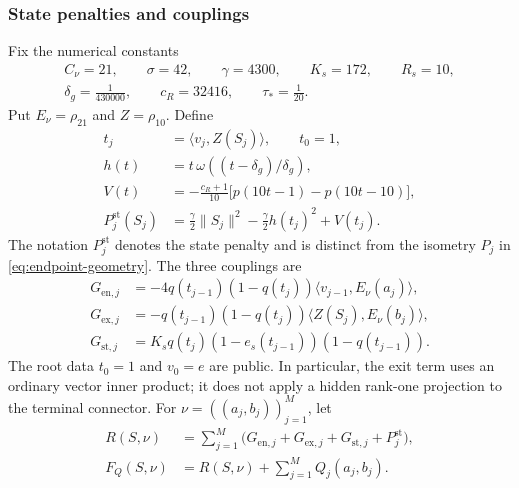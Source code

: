 \documentclass[11pt,letterpaper]{article}
\theoremstyle{definition}
\theoremstyle{remark}
\begin{document}
\subsubsection{State penalties and couplings}

Fix the numerical constants
\begin{equation}
\begin{gathered}
 C_\nu=21,\qquad \sigma=42,\qquad \gamma=4300,
 \qquad K_s=172,\qquad R_s=10,\\
 \delta_g=\frac1{430000},\qquad c_R=32416,
 \qquad \tau_* =\frac1{20}.
\end{gathered}
\label{eq:outer-constants}
\end{equation}
Put $E_\nu=\rho_{21}$ and $Z=\rho_{10}$.  Define
\begin{equation}
\begin{split}
 t_j&=\langle v_j,Z(S_j)\rangle,\qquad t_0=1,\\
 h(t)&=t\,\omega((t-\delta_g)/\delta_g),\\
 V(t)&=-\frac{c_R+1}{10}
                 \bigl[p(10t-1)-p(10t-10)\bigr],\\
 P_j^{\mathrm{st}}(S_j)
 &=\frac\gamma2\|S_j\|^2-\frac\gamma2h(t_j)^2+V(t_j).
\end{split}
\label{eq:outer-state}
\end{equation}
The notation $P_j^{\mathrm{st}}$ denotes the state penalty and is
distinct from the isometry $P_j$ in \eqref{eq:endpoint-geometry}.
The three couplings are
\begin{align}
 G_{\mathrm{en},j}
 &=-4q(t_{j-1})(1-q(t_j))
                      \langle v_{j-1},E_\nu(a_j)\rangle,
 \label{eq:outer-entrance}\\
 G_{\mathrm{ex},j}
 &=-q(t_{j-1})(1-q(t_j))
                      \langle Z(S_j),E_\nu(b_j)\rangle,
 \label{eq:outer-exit}\\
 G_{\mathrm{st},j}
 &=K_sq(t_j)(1-e_s(t_{j-1}))(1-q(t_{j-1})).
 \label{eq:outer-coupling}
\end{align}
The root data $t_0=1$ and $v_0=e$ are public.
In particular, the exit term uses an ordinary vector inner product;
it does not apply a hidden rank-one projection to the terminal
connector.
For $\nu=((a_j,b_j))_{j=1}^M$, let
\begin{equation}
\begin{split}
 R(S,\nu)&=\sum_{j=1}^M
   \bigl(G_{\mathrm{en},j}+G_{\mathrm{ex},j}
                 +G_{\mathrm{st},j}+P_j^{\mathrm{st}}\bigr),\\
 F_Q(S,\nu)&=R(S,\nu)+\sum_{j=1}^M Q_j(a_j,b_j).
\end{split}
\label{eq:outer-objective}
\end{equation}
\end{document}
